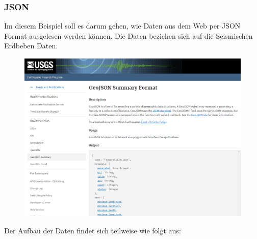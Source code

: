 \subsubsection{JSON}
Im diesem Beispiel soll es darum gehen, wie Daten aus dem Web per \gls{JSON} Format ausgelesen werden können. 
Die Daten beziehen sich auf die Seismischen Erdbeben Daten.
\begin{figure}[H]
	\centering
	\includegraphics[scale = 0.3]{attachment/chapter_3/Scc073}
\end{figure}
Der Aufbau der Daten findet sich teilweise wie folgt aus:
